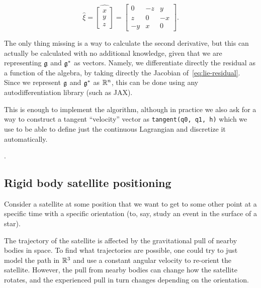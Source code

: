 \[ \hat{\xi} = \widehat{\begin{bmatrix} x \\ y \\ z\end{bmatrix}} = \begin{bmatrix}
		0  & -z & y  \\
		z  & 0  & -x \\
		-y & x  & 0
	\end{bmatrix}. \]

The only thing missing is a way to calculate the second derivative, but this can actually be calculated with no additional knowledge, given that we are representing ${\mathfrak{g}}$ and ${\mathfrak{g}}^*$ as vectors. Namely, we differentiate directly the residual as a function of the algebra, by taking directly the Jacobian of~\eqref{eq:lie-residual}. Since we represent ${\mathfrak{g}}$ and ${\mathfrak{g}}^*$ as ${\mathbb{R}}^n$, this can be done using any autodifferentiation library (such as JAX).

This is enough to implement the algorithm, although in practice we also ask for a way to construct a tangent ``velocity'' vector as \verb|tangent(q0, q1, h)| which we use to be able to define just the continuous Lagrangian and discretize it automatically.

\sourceandrepo{}.

\tocless\subsection{Rigid body satellite positioning}

Consider a satellite at some position that we want to get to some other point at a specific time with a specific orientation (to, say, study an event in the surface of a star).

The trajectory of the satellite is affected by the gravitational pull of nearby bodies in space. To find what trajectories are possible, one could try to just model the path in ${\mathbb{R}}^3$ and use a constant angular velocity to re-orient the satellite. However, the pull from nearby bodies can change how the satellite rotates, and the experienced pull in turn changes depending on the orientation.

